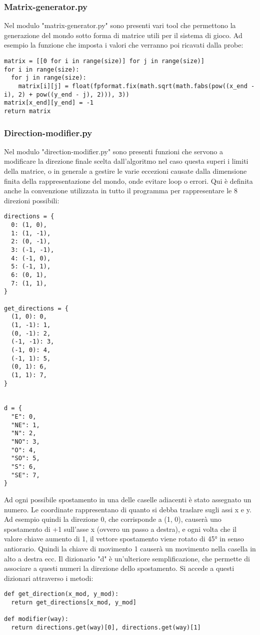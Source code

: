\subsubsection{Matrix-generator.py}
Nel modulo "matrix-generator.py" sono presenti vari tool che permettono la generazione del mondo sotto forma di matrice utili per il sistema di gioco. Ad esempio la funzione che imposta i valori che verranno poi ricavati dalla probe:
\begin{verbatim}
matrix = [[0 for i in range(size)] for j in range(size)]
for i in range(size):
  for j in range(size):
    matrix[i][j] = float(fpformat.fix(math.sqrt(math.fabs(pow((x_end - i), 2) + pow((y_end - j), 2))), 3))
matrix[x_end][y_end] = -1
return matrix
\end{verbatim}

\subsubsection{Direction-modifier.py}
Nel modulo "direction-modifier.py" sono presenti funzioni che servono a modificare la direzione finale scelta dall'algoritmo nel caso questa superi i limiti della matrice, o in generale a gestire le varie eccezioni causate dalla dimensione finita della rappresentazione del mondo, onde evitare loop o errori. Qui è definita anche la convenzione utilizzata in tutto il programma per rappresentare le 8 direzioni possibili:
\begin{verbatim}
directions = {
  0: (1, 0),
  1: (1, -1),
  2: (0, -1),
  3: (-1, -1),
  4: (-1, 0),
  5: (-1, 1),
  6: (0, 1),
  7: (1, 1),
}

get_directions = {
  (1, 0): 0,
  (1, -1): 1,
  (0, -1): 2,
  (-1, -1): 3,
  (-1, 0): 4,
  (-1, 1): 5,
  (0, 1): 6,
  (1, 1): 7,
}


d = {
  "E": 0,
  "NE": 1,
  "N": 2,
  "NO": 3,
  "O": 4,
  "SO": 5,
  "S": 6,
  "SE": 7,
}
\end{verbatim}

Ad ogni possibile spostamento in una delle caselle adiacenti è stato assegnato un numero. Le coordinate rappresentano di quanto si debba traslare sugli assi x e y. Ad esempio quindi la direzione 0, che corrisponde a (1, 0), causerà uno spostamento di +1 sull'asse x (ovvero un passo a destra), e ogni volta che il valore chiave aumento di 1, il vettore spostamento viene rotato di 45° in senso antiorario. Quindi la chiave di movimento 1 causerà un movimento nella casella in alto a destra ecc. Il dizionario "d" è un'ulteriore semplificazione, che permette di associare a questi numeri la direzione dello spostamento. Si accede a questi dizionari attraverso i metodi:
\begin{verbatim}
def get_direction(x_mod, y_mod):
  return get_directions[x_mod, y_mod]

def modifier(way):
  return directions.get(way)[0], directions.get(way)[1]

\end{verbatim}


